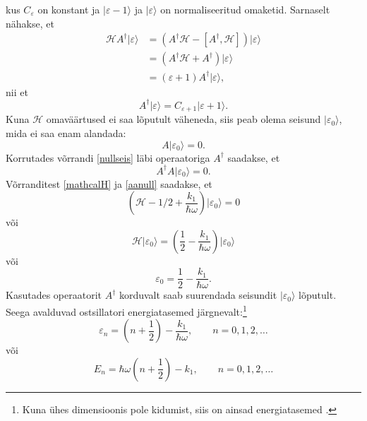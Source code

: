\documentclass{trkut}%
\renewcommand\ket[1]{{|{#1}\rangle}}
\begin{document}
kus $C_\varepsilon$ on konstant ja $\ket{\varepsilon -1}$ ja $\ket{\varepsilon}$ on normaliseeritud omaketid.
Sarnaselt nähakse, et
\begin{align}
        \mathcal{H}A^\dagger\ket{\varepsilon}&=\left(A^\dagger\mathcal{H}-[A^\dagger, \mathcal{H}]\right)\ket{\varepsilon} \nonumber \\
        &=(A^\dagger\mathcal{H}+A^\dagger)\ket{\varepsilon} \nonumber \\
        &=(\varepsilon + 1)A^\dagger\ket{\varepsilon},
\end{align}
nii et
\begin{equation}
    A^\dagger\ket{\varepsilon}=C_{\varepsilon+1} \ket{\varepsilon+1}.
    \label{cepsilon1}
\end{equation}
Kuna $\mathcal{H}$ omaväärtused ei saa lõputult väheneda, siis peab olema seisund $\ket{\varepsilon_0}$, mida ei saa enam alandada:
\begin{equation}
    A\ket{\varepsilon_0}=0.
    \label{nullseis}
\end{equation}
Korrutades võrrandi \eqref{nullseis} läbi operaatoriga $A^\dagger$ saadakse, et
\begin{equation}
    A^\dagger A\ket{\varepsilon_0}=0.
    \label{aanull}
\end{equation}
Võrranditest \eqref{mathcalH} ja \eqref{aanull} saadakse, et
\begin{equation}
    \left(\mathcal{H}-1/2 + \frac{k_1}{\hbar \omega} \right)\ket{\varepsilon_0}=0
\end{equation}
või
\begin{equation}
    \mathcal{H}\ket{\varepsilon_0}=\left(\frac{1}{2} - \frac{k_1}{\hbar \omega}\right) \ket{\varepsilon_0}
\end{equation}
või
\begin{equation}
    \varepsilon_0=\frac{1}{2} - \frac{k_1}{\hbar \omega}.
\end{equation}
Kasutades operaatorit $A^\dagger$ korduvalt saab suurendada seisundit $\ket{\varepsilon_0}$ lõputult. Seega avalduvad ostsillatori energiatasemed järgnevalt:\footnote{Kuna ühes dimensioonis pole kidumist, siis on ainsad energiatasemed \parencite[176-177]{shankar94}.}
\begin{equation}
    \varepsilon_n=\left(n+\frac{1}{2}\right)-\frac{k_1}{\hbar \omega}, \qquad n=0, 1, 2,\dots
\end{equation}
või
\begin{equation}
    E_n=\hbar \omega \left(n+\frac{1}{2}\right)-k_1, \qquad n=0, 1, 2,\dots
    \label{nullenergia}
\end{equation}
\end{document}
